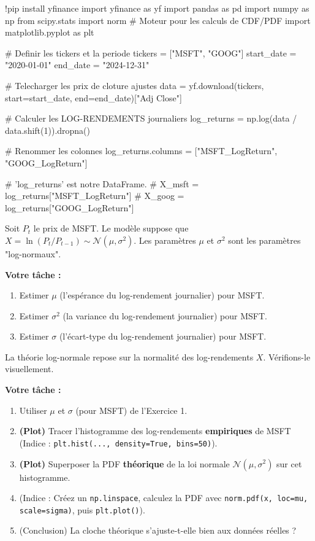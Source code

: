 \begin{codecell}
!pip install yfinance
import yfinance as yf
import pandas as pd
import numpy as np
from scipy.stats import norm # Moteur pour les calculs de CDF/PDF
import matplotlib.pyplot as plt

# Definir les tickers et la periode
tickers = ["MSFT", "GOOG"]
start_date = "2020-01-01"
end_date = "2024-12-31"

# Telecharger les prix de cloture ajustes
data = yf.download(tickers, start=start_date, end=end_date)["Adj Close"]

# Calculer les LOG-RENDEMENTS journaliers
log_returns = np.log(data / data.shift(1)).dropna()

# Renommer les colonnes
log_returns.columns = ["MSFT_LogReturn", "GOOG_LogReturn"]

# 'log_returns' est notre DataFrame.
# X_msft = log_returns["MSFT_LogReturn"]
# X_goog = log_returns["GOOG_LogReturn"]
\end{codecell}

\begin{exercicebox}
Soit $P_t$ le prix de MSFT. Le modèle suppose que $X = \ln(P_t/P_{t-1}) \sim \mathcal{N}(\mu, \sigma^2)$. Les paramètres $\mu$ et $\sigma^2$ sont les paramètres "log-normaux".

\textbf{Votre tâche :}
\begin{enumerate}
    \item Estimer $\mu$ (l'espérance du log-rendement journalier) pour MSFT.
    \item Estimer $\sigma^2$ (la variance du log-rendement journalier) pour MSFT.
    \item Estimer $\sigma$ (l'écart-type du log-rendement journalier) pour MSFT.
\end{enumerate}
\end{exercicebox}

\begin{exercicebox}
La théorie log-normale repose sur la normalité des log-rendements $X$. Vérifions-le visuellement.

\textbf{Votre tâche :}
\begin{enumerate}
    \item Utiliser $\mu$ et $\sigma$ (pour MSFT) de l'Exercice 1.
    \item \textbf{(Plot)} Tracer l'histogramme des log-rendements \textbf{empiriques} de MSFT (Indice : \texttt{plt.hist(..., density=True, bins=50)}).
    \item \textbf{(Plot)} Superposer la PDF \textbf{théorique} de la loi normale $\mathcal{N}(\mu, \sigma^2)$ sur cet histogramme.
    \item (Indice : Créez un \texttt{np.linspace}, calculez la PDF avec \texttt{norm.pdf(x, loc=mu, scale=sigma)}, puis \texttt{plt.plot()}).
    \item (Conclusion) La cloche théorique s'ajuste-t-elle bien aux données réelles ?
\end{enumerate}
\end{exercicebox}

